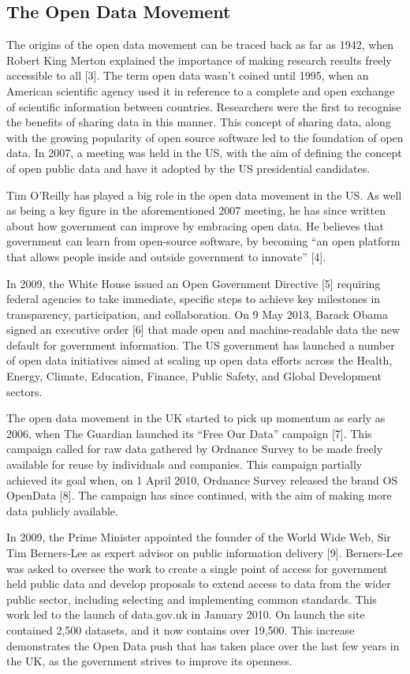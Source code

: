 \documentclass[authoryearcitations]{UoYCSproject}
\begin{document}
\subsection{The Open Data Movement}
The origins of the open data movement can be traced back as far as 1942, when Robert King Merton explained the importance of making research results freely accessible to all [3]. The term open data wasn’t coined until 1995, when an American scientific agency used it in reference to a complete and open exchange of scientific information between countries. Researchers were the first to recognise the benefits of sharing data in this manner. This concept of sharing data, along with the growing popularity of open source software led to the foundation of open data. In 2007, a meeting was held in the US, with the aim of defining the concept of open public data and have it adopted by the US presidential candidates. 

Tim O’Reilly has played a big role in the open data movement in the US. As well as being a key figure in the aforementioned 2007 meeting, he has since written about how government can improve by embracing open data.  He believes that government can learn from open-source software, by becoming “an open platform that allows people inside and outside government to innovate” [4]. 

In 2009,  the White House issued an Open Government Directive [5] requiring federal agencies to take immediate, specific steps to achieve key milestones in transparency, participation, and collaboration. On 9 May 2013, Barack Obama signed an executive order [6] that made open and machine-readable data the new default for government information. The US government has launched a number of open data initiatives aimed at scaling up open data efforts across the Health, Energy, Climate, Education, Finance, Public Safety, and Global Development sectors.

The open data movement in the UK started to pick up momentum as early as 2006, when The Guardian launched its “Free Our Data” campaign [7]. This campaign called for raw data gathered by Ordnance Survey to be made freely available for reuse by individuals and companies. This campaign partially achieved its goal when, on 1 April 2010, Ordnance Survey released the brand OS OpenData [8]. The campaign has since continued, with the aim of making more data publicly available. 

In 2009, the Prime Minister appointed the founder of the World Wide Web, Sir Tim Berners-Lee as expert advisor on public information delivery [9]. Berners-Lee was asked to oversee the work to create a single point of access for government held public data and develop proposals to extend access to data from the wider public sector, including selecting and implementing common standards. This work led to the launch of data.gov.uk in January 2010. On launch the site contained 2,500 datasets, and it now contains over 19,500. This increase demonstrates the Open Data push that has taken place over the last few years in the UK, as the government strives to improve its openness. 
\end{document}
